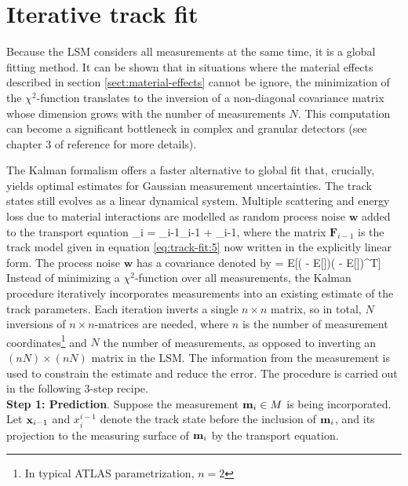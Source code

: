 \section{Iterative track fit}
\label{sect:kalman-filter}

Because the LSM considers all measurements at the same time, it is a global fitting method. 
It can be shown that in situations where the material effects described in section \ref{sect:material-effects} cannot be ignore, the minimization of the $\chi^2$-function translates to the inversion of a non-diagonal covariance matrix whose dimension grows with the number of measurements $N$. 
This computation can become a significant bottleneck in complex and granular detectors (see chapter 3 of reference \cite{Regler2000-ie} for more details).

The Kalman formalism \cite{Mankel_2004, BILLOIR1984352, FRUHWIRTH1987444} offers a faster alternative to global fit that, crucially, yields optimal estimates for Gaussian measurement uncertainties. 
The track states still evolves as a linear dynamical system.
Multiple scattering and energy loss due to material interactions are modelled as random process noise $\mathbf{w}$ added to the transport equation 
\beq
\label{eq:track-fit:12}
\bfx_i = _{i-1}\bfx_{i-1} + _{i-1},
\eeq
where the matrix $\mathbf{F}_{i-1}$ is the track model given in equation \eqref{eq:track-fit:5} now written in the explicitly linear form. 
The process noise $\mathbf{w}$ has a covariance denoted by
\beq
\label{eq:track-fit:13}
 = E[( - E[])( - E[])^T]
\eeq
Instead of minimizing a $\chi^2$-function over all measurements, the Kalman procedure iteratively incorporates measurements into an existing estimate of the track parameters. 
Each iteration inverts a single $n\times n$ matrix, so in total, $N$ inversions of $n\times n$-matrices are needed, where $n$ is the number of measurement coordinates\footnote{In typical ATLAS parametrization, $n=2$} and $N$ the number of measurements, as opposed to inverting an $(nN)\times (nN)$ matrix in the LSM.
The information from the measurement is used to constrain the estimate and reduce the error. 
The procedure is carried out in the following 3-step recipe. \\
\textbf{Step 1: Prediction}. Suppose the measurement $\mathbf{m}_i\in M$ is being incorporated. 
Let $\mathbf{x}_{i-1}$ and $x_{i}^{i-1}$ denote the track state before the inclusion of $\mathbf{m}_i$, and its projection to the measuring surface of $\mathbf{m}_i$ by the transport equation.

